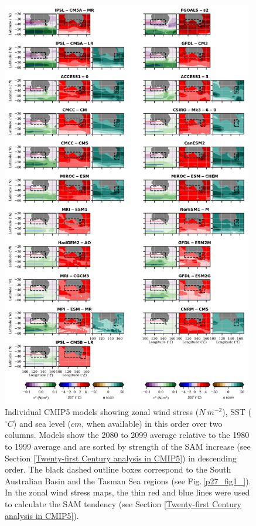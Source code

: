 \documentclass[draft,linenumbers]{agujournal2018}
\begin{document}
\begin{figure}[h]
\centering
\includegraphics[width=0.98\textwidth]{p25_fig3_.png}
\caption{Individual CMIP5 models showing zonal wind stress ($N\ m^{-2}$), SST ($^{\circ}C$) and sea level ($cm$, when available) in this order over two columns. Models show the 2080 to 2099 average relative to the 1980 to 1999 average and are sorted by strength of the SAM increase (see Section \ref{Twenty-first Century analysis in CMIP5}) in descending order. The black dashed outline boxes correspond to the South Australian Basin and the Tasman Sea regions (see Fig.\,\ref{p27_fig1_}). In the zonal wind stress maps, the thin red and blue lines were used to calculate the SAM tendency (see Section \ref{Twenty-first Century analysis in CMIP5}).}\label{p25_fig2_}
\end{figure}
\end{document}

